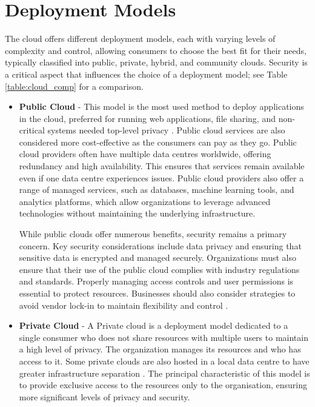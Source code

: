 \section{Deployment Models}
The cloud offers different deployment models, each with varying levels of complexity and control, allowing consumers to choose the best fit for their needs, typically classified into public, private, hybrid, and community clouds. Security is a critical aspect that influences the choice of a deployment model; see Table \ref{table:cloud_comp} for a comparison. 
\begin{itemize}
    \item  \textbf{Public Cloud} - This model is the most used method to deploy applications in the cloud, preferred for running web applications, file sharing, and non-critical systems needed top-level privacy \citep{cloudmodel}. Public cloud services are also considered more cost-effective as the consumers can pay as they go. Public cloud providers often have multiple data centres worldwide, offering redundancy and high availability. This ensures that services remain available even if one data centre experiences issues. Public cloud providers also offer a range of managed services, such as databases, machine learning tools, and analytics platforms, which allow organizations to leverage advanced technologies without maintaining the underlying infrastructure. 
    
    While public clouds offer numerous benefits, security remains a primary concern. Key security considerations include data privacy and ensuring that sensitive data is encrypted and managed securely. Organizations must also ensure that their use of the public cloud complies with industry regulations and standards. Properly managing access controls and user permissions is essential to protect resources. Businesses should also consider strategies to avoid vendor lock-in to maintain flexibility and control  \citep{cloudmodel}.
    
    \item  \textbf{Private Cloud} - A Private cloud is a deployment model dedicated to a single consumer who does not share resources with multiple users to maintain a high level of privacy. The organization manages its resources and who has access to it. Some private clouds are also hosted in a local data centre to have greater infrastructure separation \citep{cloudmodel}. The principal characteristic of this model is to provide exclusive access to the resources only to the organisation, ensuring more significant levels of privacy and security. 
    

\end{itemize}
